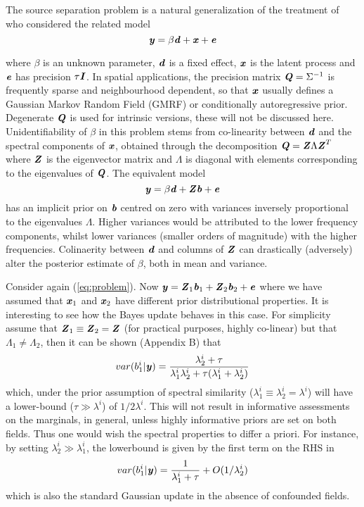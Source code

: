 \documentclass[10pt,a4paper]{article}
\newcommand{\expect} {{\mathbb{E}}}
\newcommand{\Qmat} {\textbf{\textit{Q}}}
\newcommand{\Zmat} {\textbf{\textit{Z}}}
\newcommand{\Imat} {\textbf{\textit{I}}}
\newcommand{\bvec} {\textbf{\textit{b}}}
\newcommand{\dvec} {\textbf{\textit{d}}}
\newcommand{\evec} {\textbf{\textit{e}}}
\newcommand{\xvec} {\textbf{\textit{x}}}
\newcommand{\yvec} {\textbf{\textit{y}}}
\begin{document}
The source separation problem is a natural generalization of the treatment of \cite{Hodges_2010} who considered the related model
\begin{equation}\label{eq:problem2}
\yvec = \beta \dvec + \xvec + \evec
\end{equation}

\noindent where $\beta$ is an unknown parameter, $\dvec$ is a fixed effect, $\xvec$ is the latent process and $\evec$ has precision $\tau\Imat$. In spatial applications, the precision matrix $\Qmat = \Sigma^{-1}$ is frequently sparse and neighbourhood dependent, so that $\xvec$ usually defines a Gaussian Markov Random Field (GMRF) or conditionally autoregressive prior. Degenerate $\Qmat$ is used for intrinsic versions, these will not be discussed here.  Unidentifiability of $\beta$ in this problem stems from co-linearity between $\dvec$ and the spectral components of $\xvec$, obtained through the decomposition $\Qmat = \Zmat \Lambda \Zmat^T$ where $\Zmat$ is the eigenvector matrix and $\Lambda$ is diagonal with elements corresponding to the eigenvalues of $\Qmat$. The equivalent model
\begin{equation}
\yvec = \beta \dvec + \Zmat \bvec + \evec
\end{equation}
has an implicit prior on $\bvec$ centred on zero with variances inversely proportional to the eigenvalues $\Lambda$. Higher variances would be attributed to the lower frequency components, whilst lower variances (smaller orders of magnitude) with the higher frequencies. Colinaerity between $\dvec$ and columns of $\Zmat$ can drastically (adversely) alter the posterior estimate of $\beta$, both in mean and variance. 

Consider again (\ref{eq:problem}). Now $\yvec  = \Zmat_1 \bvec_1 + \Zmat_2 \bvec_2 + \evec$ where we have assumed that $\xvec_1$ and $\xvec_2$ have different prior distributional properties. It is interesting to see how the Bayes update behaves in this case. For simplicity assume that $\Zmat_1 \equiv \Zmat_2 = \Zmat$ (for practical purposes, highly co-linear) but that $\Lambda_1 \ne \Lambda_2$, then it can be shown (Appendix B) that 
\begin{equation}
var(b^i_1 | \yvec) = \frac{\lambda^i_2 + \tau}{\lambda^i_1\lambda^i_2 + \tau(\lambda^i_1 + \lambda^i_2)} 
\end{equation}
\noindent which, under the prior assumption of spectral similarity ($\lambda^i_1 \equiv \lambda^i_2 = \lambda^i$) will have a lower-bound ($\tau \gg \lambda^i$) of $1/2\lambda^i$. This will not result in informative assessments on the marginals, in general, unless highly informative priors are set on both fields. Thus one would wish the spectral properties to differ a priori. For instance, by setting $\lambda_2^i \gg \lambda_1^i$, the lowerbound is given by the first term on the RHS in
\begin{equation}
var(b^i_1 | \yvec) = \frac{1}{\lambda^i_1 + \tau} + O(1/\lambda_2^i)
\end{equation}
\noindent which is also the standard Gaussian update in the absence of confounded fields. 
\end{document}
